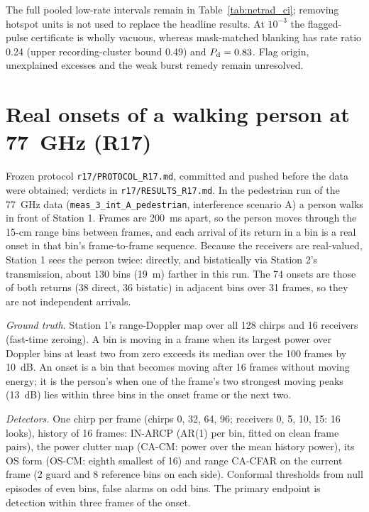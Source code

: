 \documentclass[10pt]{article}
\begin{document}
The full pooled low-rate intervals remain in Table~\ref{tab:netrad_ci}; removing hotspot units is not used to replace the headline results. At $10^{-3}$ the flagged-pulse certificate is wholly vacuous, whereas mask-matched blanking has rate ratio 0.24 (upper recording-cluster bound 0.49) and $P_{\rm d}=0.83$. Flag origin, unexplained excesses and the weak burst remedy remain unresolved.

\section{Real onsets of a walking person at 77~GHz (R17)}\label{sup:r17}
Frozen protocol \texttt{r17/PROTOCOL\_R17.md}, committed and pushed before the data were obtained; verdicts in \texttt{r17/RESULTS\_R17.md}. In the pedestrian run of the 77~GHz data (\texttt{meas\_3\_int\_A\_pedestrian}, interference scenario A) a person walks in front of Station 1. Frames are 200~ms apart, so the person moves through the 15-cm range bins between frames, and each arrival of its return in a bin is a real onset in that bin's frame-to-frame sequence. Because the receivers are real-valued, Station 1 sees the person twice: directly, and bistatically via Station 2's transmission, about 130 bins (19~m) farther in this run. The 74 onsets are those of both returns (38 direct, 36 bistatic) in adjacent bins over 31 frames, so they are not independent arrivals.

\emph{Ground truth.} Station 1's range-Doppler map over all 128 chirps and 16 receivers (fast-time zeroing). A bin is moving in a frame when its largest power over Doppler bins at least two from zero exceeds its median over the 100 frames by 10~dB. An onset is a bin that becomes moving after 16 frames without moving energy; it is the person's when one of the frame's two strongest moving peaks (13~dB) lies within three bins in the onset frame or the next two.

\emph{Detectors.} One chirp per frame (chirps 0, 32, 64, 96; receivers 0, 5, 10, 15: 16 looks), history of 16 frames: IN-ARCP (AR(1) per bin, fitted on clean frame pairs), the power clutter map (CA-CM: power over the mean history power), its OS form (OS-CM: eighth smallest of 16) and range CA-CFAR on the current frame (2 guard and 8 reference bins on each side). Conformal thresholds from null episodes of even bins, false alarms on odd bins. The primary endpoint is detection within three frames of the onset.
\end{document}
